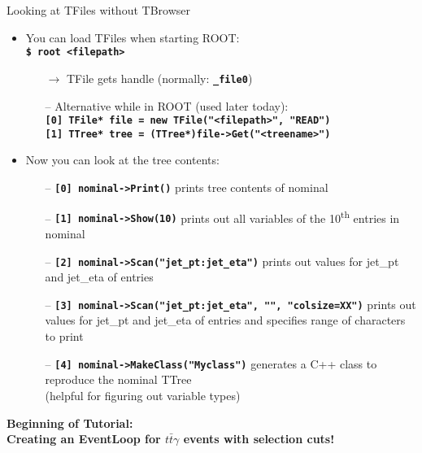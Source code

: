 \documentclass[10pt, aspectratio=169]{beamer}
\begin{document}
\begin{frame}{Looking at TFiles without TBrowser}
  \begin{itemize}
    \item
      You can load TFiles when starting ROOT: \\ \textbf{\texttt{\$ root <filepath>}}
    \begin{itemize}
      \item[$\rightarrow$] TFile gets handle (normally: \textbf{\texttt{\_file0}})
      \item[--] Alternative while in ROOT (used later today): \\ \textbf{\texttt{[0] TFile* file = new TFile("<filepath>", "READ")}} \\ \textbf{\texttt{[1] TTree* tree = (TTree*)file->Get("<treename>")}}
      
    \end{itemize}
    \item
      Now you can look at the tree contents:
    \begin{itemize}
      \item[--] \textbf{\texttt{[0] nominal->Print()}} prints tree contents of nominal
      \item[--] \textbf{\texttt{[1] nominal->Show(10)}} prints out all variables of the 10\textsuperscript{th} entries in nominal
      \item[--] \textbf{\texttt{[2] nominal->Scan("jet\_pt:jet\_eta")}} prints out values for jet\_pt and jet\_eta of entries
       \item[--] \textbf{\texttt{[3] nominal->Scan("jet\_pt:jet\_eta", "", "colsize=XX")}} prints out values for jet\_pt and jet\_eta of entries and specifies range of characters to print
      \item[--] \textbf{\texttt{[4] nominal->MakeClass("Myclass")}} generates a C++ class to reproduce the nominal TTree \\ (helpful for figuring out variable types)
    \end{itemize}
  \end{itemize}
\end{frame}




\begin{frame}

  \begin{center}
  \ugoeAddLogo
  \Large\bfseries Beginning of Tutorial: \\
  \large Creating an EventLoop for $t\bar{t}\gamma$ events with selection cuts!
  \end{center}
\end{frame}
\end{document}
